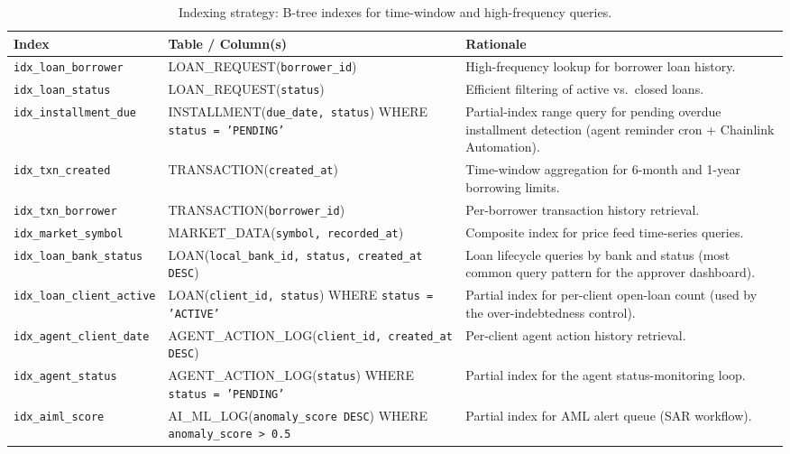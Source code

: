 \documentclass[12pt,a4paper]{report}
\begin{document}
\begin{table}[H]
\centering
\caption{Indexing strategy: B-tree indexes for time-window and high-frequency queries.}
\begin{tabular}{p{4cm}p{3cm}p{6.5cm}}
\hline
\textbf{Index} & \textbf{Table / Column(s)} & \textbf{Rationale} \\
\hline
\texttt{idx\_loan\_borrower} & LOAN\_REQUEST(\texttt{borrower\_id}) & High-frequency lookup for borrower loan history. \\
\hline
\texttt{idx\_loan\_status} & LOAN\_REQUEST(\texttt{status}) & Efficient filtering of active vs.\ closed loans. \\
\hline
\texttt{idx\_installment\_due} & INSTALLMENT(\texttt{due\_date, status}) \newline WHERE \texttt{status = 'PENDING'} & Partial-index range query for pending overdue installment detection (agent reminder cron + Chainlink Automation). \\
\hline
\texttt{idx\_txn\_created} & TRANSACTION(\texttt{created\_at}) & Time-window aggregation for 6-month and 1-year borrowing limits. \\
\hline
\texttt{idx\_txn\_borrower} & TRANSACTION(\texttt{borrower\_id}) & Per-borrower transaction history retrieval. \\
\hline
\texttt{idx\_market\_symbol} & MARKET\_DATA(\texttt{symbol, recorded\_at}) & Composite index for price feed time-series queries. \\
\hline
\texttt{idx\_loan\_bank\_status} & LOAN(\texttt{local\_bank\_id, status, created\_at DESC}) & Loan lifecycle queries by bank and status (most common query pattern for the approver dashboard). \\
\hline
\texttt{idx\_loan\_client\_active} & LOAN(\texttt{client\_id, status}) \newline WHERE \texttt{status = 'ACTIVE'} & Partial index for per-client open-loan count (used by the over-indebtedness control). \\
\hline
\texttt{idx\_agent\_client\_date} & AGENT\_ACTION\_LOG(\texttt{client\_id, created\_at DESC}) & Per-client agent action history retrieval. \\
\hline
\texttt{idx\_agent\_status} & AGENT\_ACTION\_LOG(\texttt{status}) \newline WHERE \texttt{status = 'PENDING'} & Partial index for the agent status-monitoring loop. \\
\hline
\texttt{idx\_aiml\_score} & AI\_ML\_LOG(\texttt{anomaly\_score DESC}) \newline WHERE \texttt{anomaly\_score > 0.5} & Partial index for AML alert queue (SAR workflow). \\

\end{tabular}
\end{table}
\end{document}
